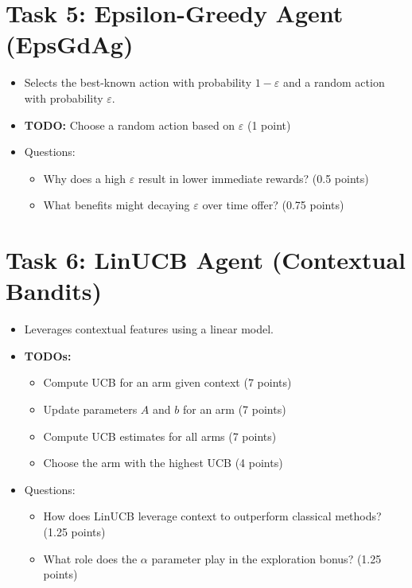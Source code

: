 \documentclass[12pt]{article}
\begin{document}
{{{\section{Task 5: Epsilon-Greedy Agent (EpsGdAg)}
\begin{itemize}[noitemsep]
    \item Selects the best-known action with probability \(1-\varepsilon\) and a random action with probability \(\varepsilon\).
    \item \textbf{TODO:} Choose a random action based on \(\varepsilon\) (1 point)
    \item Questions:
    \begin{itemize}[noitemsep]
        \item Why does a high \(\varepsilon\) result in lower immediate rewards? (0.5 points)
        \item What benefits might decaying \(\varepsilon\) over time offer? (0.75 points)
    \end{itemize}
\end{itemize}

\section{Task 6: LinUCB Agent (Contextual Bandits)}
\begin{itemize}[noitemsep]
    \item Leverages contextual features using a linear model.
    \item \textbf{TODOs:}
    \begin{itemize}[noitemsep]
        \item Compute UCB for an arm given context (7 points)
        \item Update parameters \(A\) and \(b\) for an arm (7 points)
        \item Compute UCB estimates for all arms (7 points)
        \item Choose the arm with the highest UCB (4 points)
    \end{itemize}
    \item Questions:
    \begin{itemize}[noitemsep]
        \item How does LinUCB leverage context to outperform classical methods? (1.25 points)
        \item What role does the \(\alpha\) parameter play in the exploration bonus? (1.25 points)
    \end{itemize}
\end{itemize}

}}}
\end{document}
